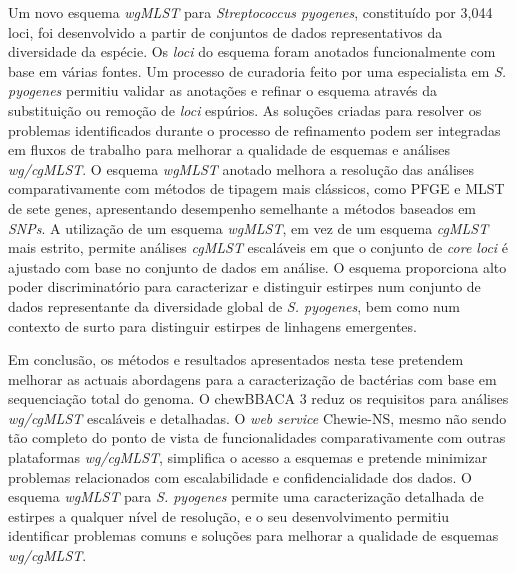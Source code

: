 Um novo esquema \textit{wgMLST} para \textit{Streptococcus pyogenes}, constituído por 3,044 loci, foi desenvolvido a partir de conjuntos de dados representativos da diversidade da espécie. Os \textit{loci} do esquema foram anotados funcionalmente com base em várias fontes. Um processo de curadoria feito por uma especialista em \textit{S. pyogenes} permitiu validar as anotações e refinar o esquema através da substituição ou remoção de \textit{loci} espúrios. As soluções criadas para resolver os problemas identificados durante o processo de refinamento podem ser integradas em fluxos de trabalho para melhorar a qualidade de esquemas e análises \textit{wg/cgMLST}. O esquema \textit{wgMLST} anotado melhora a resolução das análises comparativamente com métodos de tipagem mais clássicos, como PFGE e MLST de sete genes, apresentando desempenho semelhante a métodos baseados em \textit{SNPs}. A utilização de um esquema \textit{wgMLST}, em vez de um esquema \textit{cgMLST} mais estrito, permite análises \textit{cgMLST} escaláveis em que o conjunto de \textit{core loci} é ajustado com base no conjunto de dados em análise. O esquema proporciona alto poder discriminatório para caracterizar e distinguir estirpes num conjunto de dados representante da diversidade global de \textit{S. pyogenes}, bem como num contexto de surto para distinguir estirpes de linhagens emergentes.

Em conclusão, os métodos e resultados apresentados nesta tese pretendem melhorar as actuais abordagens para a caracterização de bactérias com base em sequenciação total do genoma. O chewBBACA 3 reduz os requisitos para análises \textit{wg/cgMLST} escaláveis e detalhadas. O \textit{web service} Chewie-NS, mesmo não sendo tão completo do ponto de vista de funcionalidades comparativamente com outras plataformas \textit{wg/cgMLST}, simplifica o acesso a esquemas e pretende minimizar problemas relacionados com escalabilidade e confidencialidade dos dados. O esquema \textit{wgMLST} para \textit{S. pyogenes} permite uma caracterização detalhada de estirpes a qualquer nível de resolução, e o seu desenvolvimento permitiu identificar problemas comuns e soluções para melhorar a qualidade de esquemas \textit{wg/cgMLST}.
